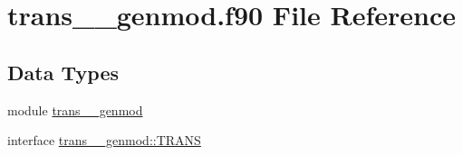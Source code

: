 \hypertarget{trans____genmod_8f90}{\section{trans\+\_\+\+\_\+genmod.\+f90 File Reference}
\label{trans____genmod_8f90}
}
\subsection*{Data Types}
\begin{DoxyCompactItemize}
\item 
module \hyperlink{classtrans____genmod}{trans\+\_\+\+\_\+genmod}
\item 
interface \hyperlink{interfacetrans____genmod_1_1TRANS}{trans\+\_\+\+\_\+genmod\+::\+T\+R\+A\+N\+S}
\end{DoxyCompactItemize}
